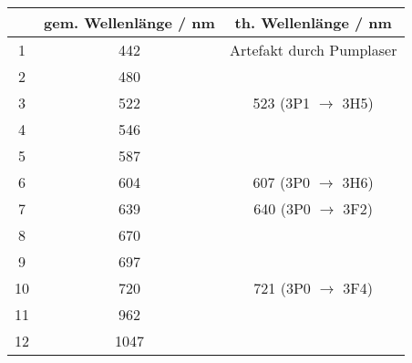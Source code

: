 \begin{center}
\begin{tabular}{|c|c|c|}
\hline
  & gem. Wellenlänge / nm & th. Wellenlänge / nm \cite{Versuchsanleitung} \\ \hline
1 & 442 & Artefakt durch Pumplaser \\ \hline
2 & 480 &  \\ \hline
3 & 522 & 523 (3P1 $\rightarrow$ 3H5) \\ \hline
4 & 546 &  \\ \hline
5 & 587 &  \\ \hline
6 & 604 & 607 (3P0 $\rightarrow$ 3H6) \\ \hline
7 & 639 & 640 (3P0 $\rightarrow$ 3F2) \\ \hline
8 & 670 &  \\ \hline
9 & 697 &  \\ \hline
10 & 720 & 721 (3P0 $\rightarrow$ 3F4) \\ \hline
11 & 962 &  \\ \hline
12 & 1047 &  \\ \hline
\end{tabular}
\end{center}